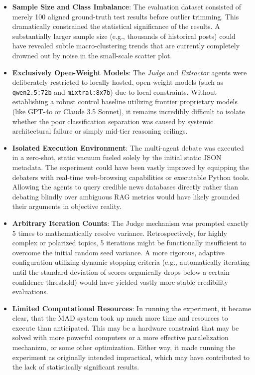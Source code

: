 \begin{itemize}
    \item \textbf{Sample Size and Class Imbalance}: The evaluation dataset consisted of merely 100 aligned ground-truth test results before outlier trimming. This dramatically constrained the statistical significance of the results. A substantially larger sample size (e.g., thousands of historical posts) could have revealed subtle macro-clustering trends that are currently completely drowned out by noise in the small-scale scatter plot.
    \item \textbf{Exclusively Open-Weight Models}: The \textit{Judge} and \textit{Extractor} agents were deliberately restricted to locally hosted, open-weight models (such as \texttt{qwen2.5:72b} and \texttt{mixtral:8x7b}) due to local constraints. Without establishing a robust control baseline utilizing frontier proprietary models (like GPT-4o or Claude 3.5 Sonnet), it remains incredibly difficult to isolate whether the poor classification separation was caused by systemic architectural failure or simply mid-tier reasoning ceilings.
    \item \textbf{Isolated Execution Environment}: The multi-agent debate was executed in a zero-shot, static vacuum fueled solely by the initial static JSON metadata. The experiment could have been vastly improved by equipping the debaters with real-time web-browsing capabilities or executable Python tools. Allowing the agents to query credible news databases directly rather than debating blindly over ambiguous RAG metrics would have likely grounded their arguments in objective reality.
    \item \textbf{Arbitrary Iteration Counts}: The Judge mechanism was prompted exactly 5 times to mathematically resolve variance. Retrospectively, for highly complex or polarized topics, 5 iterations might be functionally insufficient to overcome the initial random seed variance. A more rigorous, adaptive configuration utilizing dynamic stopping criteria (e.g., automatically iterating until the standard deviation of scores organically drops below a certain confidence threshold) would have yielded vastly more stable credibility evaluations.
    \item \textbf{Limited Computational Resources}: In running the experiment, it became clear, that the MAD system took up much more time and resources to execute than anticipated. This may be a hardware constraint that may be solved with more powerful computers or a more effective paralelization mechanizm, or some other optimization. Either way, it made running the experiment as originally intended impractical, which may have contributed to the lack of statistically significant results.
\end{itemize}